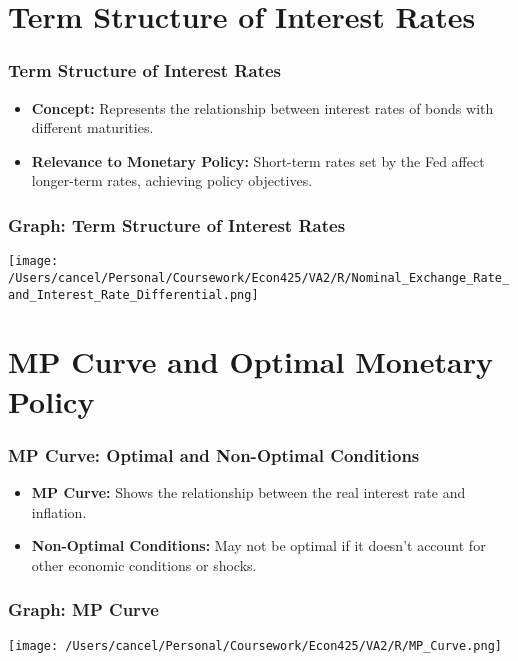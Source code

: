 \documentclass{beamer}
\begin{document}
\section{Term Structure of Interest Rates}

\begin{frame}
    \frametitle{Term Structure of Interest Rates}
    \begin{itemize}
        \item \textbf{Concept:} Represents the relationship between interest rates of bonds with different maturities.
        \item \textbf{Relevance to Monetary Policy:} Short-term rates set by the Fed affect longer-term rates, achieving policy objectives.
    \end{itemize}
\end{frame}

\begin{frame}
    \frametitle{Graph: Term Structure of Interest Rates}
    \begin{center}
        \texttt{[image: /Users/cancel/Personal/Coursework/Econ425/VA2/R/Nominal\_Exchange\_Rate\_and\_Interest\_Rate\_Differential.png]}
    \end{center}
\end{frame}

\section{MP Curve and Optimal Monetary Policy}

\begin{frame}
    \frametitle{MP Curve: Optimal and Non-Optimal Conditions}
    \begin{itemize}
        \item \textbf{MP Curve:} Shows the relationship between the real interest rate and inflation.
        \item \textbf{Non-Optimal Conditions:} May not be optimal if it doesn't account for other economic conditions or shocks.
    \end{itemize}
\end{frame}

\begin{frame}
    \frametitle{Graph: MP Curve}
    \begin{center}
        \texttt{[image: /Users/cancel/Personal/Coursework/Econ425/VA2/R/MP\_Curve.png]}
    \end{center}
\end{frame}
\end{document}
